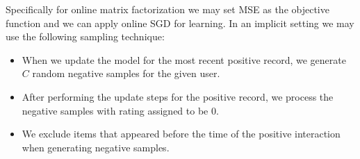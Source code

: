 \documentclass[10pt]{article}
\newenvironment{myitemize}{\begin{itemize} \setlength{\topsep}{0pt} \setlength{\itemsep}{0pt} \setlength{\parskip}{0pt} \setlength{\parsep}{0pt}}{  \end{itemize} }
\begin{document}
Specifically for online matrix factorization we may set MSE as the objective function and we can apply online SGD for learning.
In an implicit setting we may use the following sampling technique:
\begin{myitemize}
\item When we update the model for the most recent positive record, we generate $C$ random negative samples for the given user.
\item After performing the update steps for the positive record, we process the negative samples with rating assigned to be 0.
\item We exclude items that appeared before the time of the positive interaction when generating negative samples.
\end{myitemize}


\end{document}
